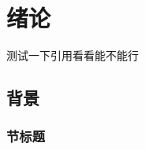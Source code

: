 \cleardoublepage

\section{绪论}
测试一下引用\cite{Enhancing2024}看看能不能行
\subsection{背景}

\subsubsection{节标题}
